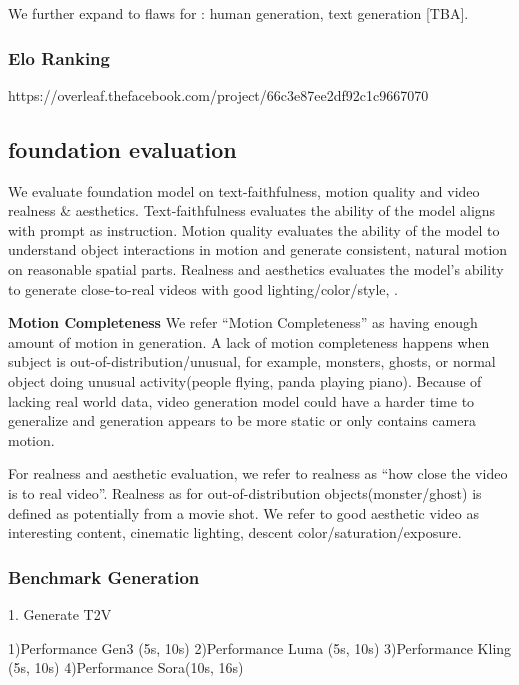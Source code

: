 We further expand to flaws for : human generation, text generation [TBA].


\subsubsection{Elo Ranking}


https://overleaf.thefacebook.com/project/66c3e87ee2df92c1c9667070



\subsection{\TextToV foundation evaluation}
\label{t2v_eval}
We evaluate \textToV foundation model on text-faithfulness, motion quality and video realness \& aesthetics.
Text-faithfulness evaluates the ability of the model aligns with prompt as instruction. Motion quality evaluates the ability of the model to understand object interactions in motion and generate consistent, natural motion on reasonable spatial parts. Realness and aesthetics evaluates the model's ability to generate close-to-real videos with good lighting/color/style, \etc.



\textbf{Motion Completeness}
We refer ``Motion Completeness'' as having enough amount of motion in generation. A lack of motion completeness happens when subject is out-of-distribution/unusual, for example, monsters, ghosts, or normal object doing unusual activity(people flying, panda playing piano). Because of lacking real world data, video generation model could have a harder time to generalize and generation appears to be more static or only contains camera motion.


For realness and aesthetic evaluation, we refer to realness as ``how close the video is to real video''. Realness as for out-of-distribution objects(monster/ghost) is defined as potentially from a movie shot. We refer to good aesthetic video as interesting content, cinematic lighting, descent color/saturation/exposure.








\subsubsection{Benchmark Generation}
1. Generate T2V

1)Performance \vs Gen3 (5s, 10s)
2)Performance \vs Luma (5s, 10s)
3)Performance \vs Kling (5s, 10s)
4)Performance \vs Sora(10s, 16s)

